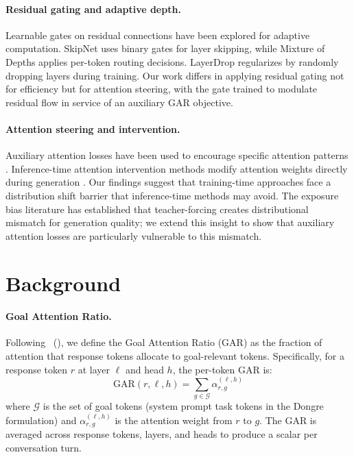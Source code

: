 \documentclass[11pt,a4paper]{article}
\newcommand{\citet}[1]{\citeauthor{#1}~(\citeyear{#1})}
\begin{document}
\paragraph{Residual gating and adaptive depth.}
Learnable gates on residual connections have been explored for adaptive computation. SkipNet \cite{wang2022skipnet} uses binary gates for layer skipping, while Mixture of Depths \cite{raposo2024mixture} applies per-token routing decisions. LayerDrop \cite{fan2020layerdrop} regularizes by randomly dropping layers during training. Our work differs in applying residual gating not for efficiency but for attention steering, with the gate trained to modulate residual flow in service of an auxiliary GAR objective.

\paragraph{Attention steering and intervention.}
Auxiliary attention losses have been used to encourage specific attention patterns \cite{strubell2018linguistically,deshpande2024gatedattention}. Inference-time attention intervention methods modify attention weights directly during generation \cite{li2024inferencetime,turner2024activationsteering}. Our findings suggest that training-time approaches face a distribution shift barrier that inference-time methods may avoid. The exposure bias literature \cite{ranzato2016sequence,bengio2015scheduled} has established that teacher-forcing creates distributional mismatch for generation quality; we extend this insight to show that auxiliary attention losses are particularly vulnerable to this mismatch.

\section{Background}

\paragraph{Goal Attention Ratio.}
Following \citet{dongre2026}, we define the Goal Attention Ratio (GAR) as the fraction of attention that response tokens allocate to goal-relevant tokens. Specifically, for a response token $r$ at layer $\ell$ and head $h$, the per-token GAR is:
\begin{equation}
\text{GAR}(r, \ell, h) = \sum_{g \in \mathcal{G}} \alpha^{(\ell,h)}_{r,g}
\end{equation}
where $\mathcal{G}$ is the set of goal tokens (system prompt task tokens in the Dongre formulation) and $\alpha^{(\ell,h)}_{r,g}$ is the attention weight from $r$ to $g$. The GAR is averaged across response tokens, layers, and heads to produce a scalar per conversation turn.
\end{document}
